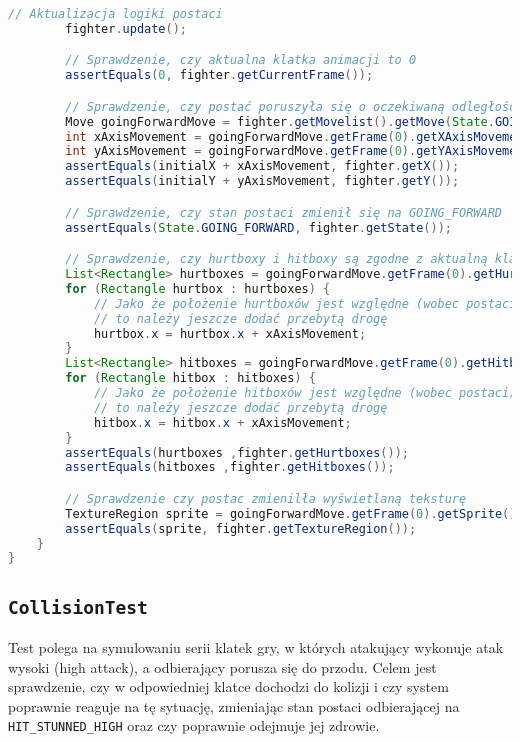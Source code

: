 \begin{lstlisting}[language=Java,style=JavaStyle,label=list:FighterTest,caption=Test metody \texttt{update} z klasy \texttt{Fighter},
                   basicstyle=\footnotesize\ttfamily]
        // Aktualizacja logiki postaci
        fighter.update();

        // Sprawdzenie, czy aktualna klatka animacji to 0
        assertEquals(0, fighter.getCurrentFrame());

        // Sprawdzenie, czy postać poruszyła się o oczekiwaną odległość
        Move goingForwardMove = fighter.getMovelist().getMove(State.GOING_FORWARD.getId());
        int xAxisMovement = goingForwardMove.getFrame(0).getXAxisMovement();
        int yAxisMovement = goingForwardMove.getFrame(0).getYAxisMovement();
        assertEquals(initialX + xAxisMovement, fighter.getX());
        assertEquals(initialY + yAxisMovement, fighter.getY());

        // Sprawdzenie, czy stan postaci zmienił się na GOING_FORWARD
        assertEquals(State.GOING_FORWARD, fighter.getState());

        // Sprawdzenie, czy hurtboxy i hitboxy są zgodne z aktualną klatką ruchu
        List<Rectangle> hurtboxes = goingForwardMove.getFrame(0).getHurtboxes();
        for (Rectangle hurtbox : hurtboxes) {
            // Jako że położenie hurtboxów jest względne (wobec postaci)
            // to należy jeszcze dodać przebytą drogę
            hurtbox.x = hurtbox.x + xAxisMovement;
        }
        List<Rectangle> hitboxes = goingForwardMove.getFrame(0).getHitboxes();
        for (Rectangle hitbox : hitboxes) {
            // Jako że położenie hitboxów jest względne (wobec postaci)
            // to należy jeszcze dodać przebytą drogę
            hitbox.x = hitbox.x + xAxisMovement;
        }
        assertEquals(hurtboxes ,fighter.getHurtboxes());
        assertEquals(hitboxes ,fighter.getHitboxes());

        // Sprawdzenie czy postac zmienilła wyświetlaną teksturę
        TextureRegion sprite = goingForwardMove.getFrame(0).getSprite();
        assertEquals(sprite, fighter.getTextureRegion());
    }
}
\end{lstlisting}

\subsection{\texttt{CollisionTest}}
Test polega na symulowaniu serii klatek gry, w których atakujący wykonuje atak wysoki (high attack), a odbierający porusza się do przodu. Celem jest sprawdzenie, czy w odpowiedniej klatce dochodzi do kolizji i czy system poprawnie reaguje na tę sytuację, zmieniając stan postaci odbierającej na \texttt{HIT\_STUNNED\_HIGH} oraz czy poprawnie odejmuje jej zdrowie.

